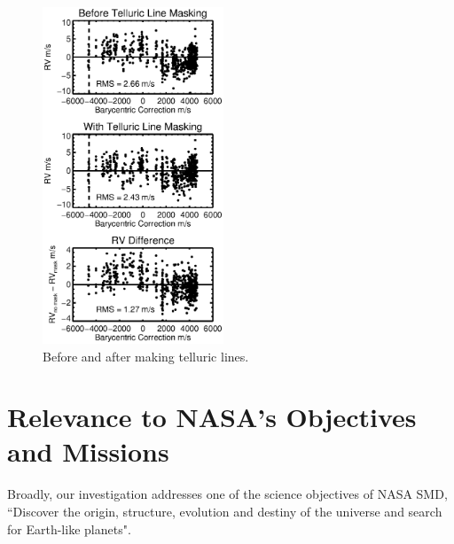 \documentclass[12pt]{article}
\begin{document}
\begin{figure}
  \vspace{-35pt}
  \begin{center}
    \includegraphics[width=0.48\textwidth]{telluric}
  \end{center}
  \vspace{-25pt}  
  \caption{Before and after making telluric lines.}
  \vspace{-8pt}  
  \label{tell}
\end{figure}


 
\vspace{-3pt}
\section{Relevance to NASA's Objectives and Missions}

Broadly, our investigation addresses one of the science
objectives of NASA SMD, ``Discover the origin, structure, evolution
and destiny of the universe and search for Earth-like planets".
\end{document}
